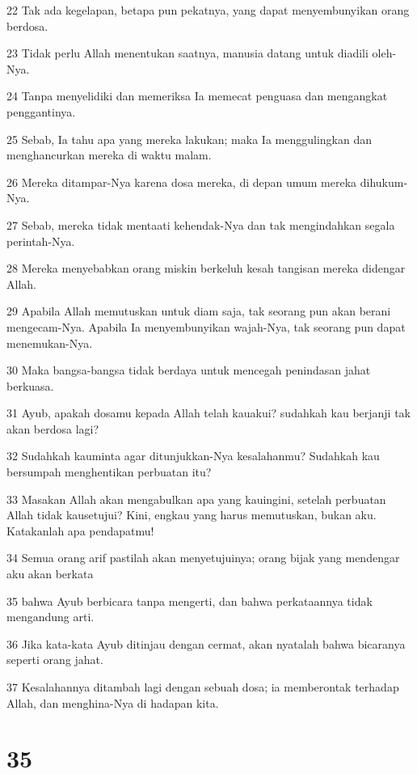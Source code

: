 \par 22 Tak ada kegelapan, betapa pun pekatnya, yang dapat menyembunyikan orang berdosa.
\par 23 Tidak perlu Allah menentukan saatnya, manusia datang untuk diadili oleh-Nya.
\par 24 Tanpa menyelidiki dan memeriksa Ia memecat penguasa dan mengangkat penggantinya.
\par 25 Sebab, Ia tahu apa yang mereka lakukan; maka Ia menggulingkan dan menghancurkan mereka di waktu malam.
\par 26 Mereka ditampar-Nya karena dosa mereka, di depan umum mereka dihukum-Nya.
\par 27 Sebab, mereka tidak mentaati kehendak-Nya dan tak mengindahkan segala perintah-Nya.
\par 28 Mereka menyebabkan orang miskin berkeluh kesah tangisan mereka didengar Allah.
\par 29 Apabila Allah memutuskan untuk diam saja, tak seorang pun akan berani mengecam-Nya. Apabila Ia menyembunyikan wajah-Nya, tak seorang pun dapat menemukan-Nya.
\par 30 Maka bangsa-bangsa tidak berdaya untuk mencegah penindasan jahat berkuasa.
\par 31 Ayub, apakah dosamu kepada Allah telah kauakui? sudahkah kau berjanji tak akan berdosa lagi?
\par 32 Sudahkah kauminta agar ditunjukkan-Nya kesalahanmu? Sudahkah kau bersumpah menghentikan perbuatan itu?
\par 33 Masakan Allah akan mengabulkan apa yang kauingini, setelah perbuatan Allah tidak kausetujui? Kini, engkau yang harus memutuskan, bukan aku. Katakanlah apa pendapatmu!
\par 34 Semua orang arif pastilah akan menyetujuinya; orang bijak yang mendengar aku akan berkata
\par 35 bahwa Ayub berbicara tanpa mengerti, dan bahwa perkataannya tidak mengandung arti.
\par 36 Jika kata-kata Ayub ditinjau dengan cermat, akan nyatalah bahwa bicaranya seperti orang jahat.
\par 37 Kesalahannya ditambah lagi dengan sebuah dosa; ia memberontak terhadap Allah, dan menghina-Nya di hadapan kita.

\chapter{35}

